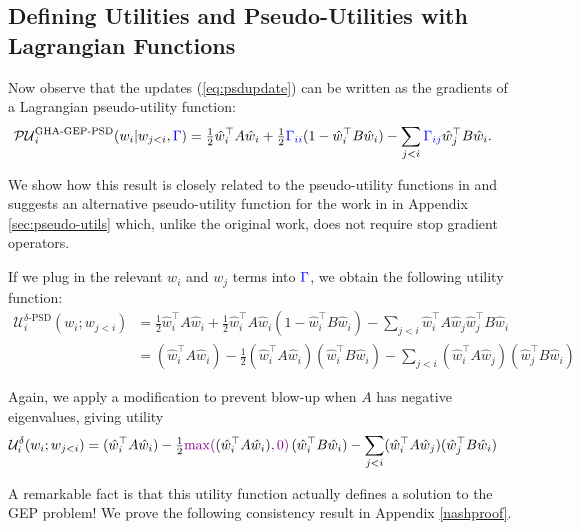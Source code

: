 \subsection{Defining Utilities and Pseudo-Utilities with Lagrangian Functions}

Now observe that the updates (\ref{eq:psdupdate}) can be written as the gradients of a Lagrangian pseudo-utility function:
\begin{align}\label{eq:lagrangeutils}
\mathcal{PU}_{i}^{\text{GHA-GEP-PSD}}(w_i | w_{j<i}, \textcolor{blue}{\Gamma} )
&=\tfrac{1}{2} \hat{w}_{i}^{\top}A\hat{w}_{i}
+\tfrac{1}{2} \textcolor{blue}{\Gamma_{ii}} (1 - \hat{w}_{i}^{\top}B\hat{w}_{i})
-\sum_{j< i} \textcolor{blue}{\Gamma_{ij}} \hat{w}_{j}^{\top}B\hat{w}_{i}.
\end{align}

We show how this result is closely related to the pseudo-utility functions in \citet{chen2019constrained} and suggests an alternative pseudo-utility function for the work in \citet{gemp2021} in Appendix \ref{sec:pseudo-utils} which, unlike the original work, does not require stop gradient operators.

If we plug in the relevant $w_i$ and $w_j$ terms into $\textcolor{blue}{\Gamma}$, we obtain the following utility function:
\begin{align}\label{eq:game-utility-psd}
\mathcal{U}_{i}^{\delta\text{-PSD}}(w_i ; w_{j<i})
&=\tfrac{1}{2}\hat{w}_{i}^{\top}A\hat{w}_{i}
+\tfrac{1}{2}\hat{w}_{i}^{\top}A\hat{w}_{i}\left(1-\hat{w}_{i}^{\top}B\hat{w}_{i}\right)
-\sum_{j< i} \hat{w}_{i}^{\top}A\hat{w}_{j} \hat{w}_{j}^{\top}B\hat{w}_{i} \nonumber \\
&= (\hat{w}_{i}^{\top}A\hat{w}_{i})
- \tfrac{1}{2} (\hat{w}_{i}^{\top}A\hat{w}_{i})(\hat{w}_{i}^{\top}B\hat{w}_{i})
- \sum_{j< i} (\hat{w}_{i}^{\top}A\hat{w}_{j})( \hat{w}_{j}^{\top}B\hat{w}_{i})
\end{align}

Again, we apply a modification to prevent blow-up when $A$ has negative eigenvalues, giving utility
\begin{align}\label{eq:game-utility}
\mathcal{U}_{i}^{\delta}(w_i ; w_{j<i})
&= (\hat{w}_{i}^{\top}A\hat{w}_{i})
- \tfrac{1}{2} \textcolor{violet}{\max(}(\hat{w}_{i}^{\top}A\hat{w}_{i})\textcolor{violet}{,0)}\,(\hat{w}_{i}^{\top}B\hat{w}_{i})
- \sum_{j< i} (\hat{w}_{i}^{\top}A\hat{w}_{j})( \hat{w}_{j}^{\top}B\hat{w}_{i})
\end{align}

A remarkable fact is that this utility function actually defines a solution to the GEP problem! We prove the following consistency result in Appendix \ref{nashproof}.

